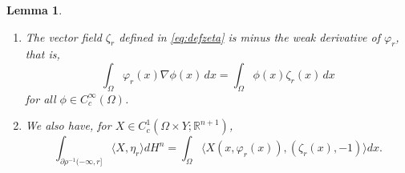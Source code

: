 \documentclass[10pt,a4paper]{amsart}
\newtheorem{lemma}{Lemma}
\newcommand{\R}{\mathbb{R}}
\begin{document}
 \begin{lemma}\label{lem:weakderivative}
 \begin{enumerate}[label=\roman*.,ref=(\roman*)]
 The following statements are true for almost every $r\in {\mathcal R}$:
  \item \label{it:weakderivative1}The vector field $\zeta_r$ defined in \eqref{eq:defzeta} is minus the weak derivative of $\varphi_r$, that is, 
  \[\int_\Omega\varphi_r(x)\nabla\phi(x)\,dx=\int_\Omega\phi(x)\zeta_r(x)\,dx\]
  for all $\phi\in C^\infty_c(\Omega)$.
  \item \label{it:weakderivative2} We also have, for $X\in C^1_c(\Omega\times Y;\R^{n+1})$, %
  \[\int_{\partial\rho^{-1}(-\infty,r]}\langle X,\eta_r\rangle dH^n
      =\int_{\Omega}\langle X(x,\varphi_r(x)),(\zeta_r(x),-1)\rangle dx.\]
  \end{enumerate}
 \end{lemma}
\end{document}
